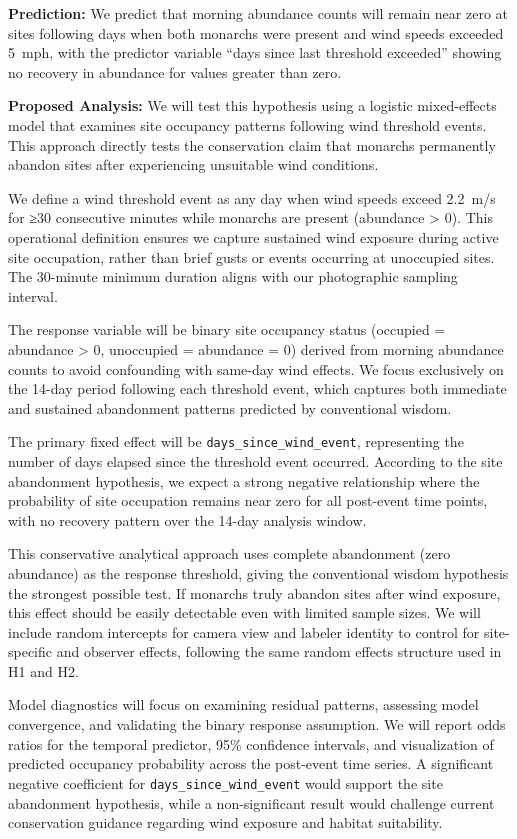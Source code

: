 \textbf{Prediction:} We predict that morning abundance counts will remain near zero at sites following days when both monarchs were present and wind speeds exceeded 5~mph, with the predictor variable ``days since last threshold exceeded'' showing no recovery in abundance for values greater than zero.

\textbf{Proposed Analysis:}
We will test this hypothesis using a logistic mixed-effects model that examines site occupancy patterns following wind threshold events. This approach directly tests the conservation claim that monarchs permanently abandon sites after experiencing unsuitable wind conditions.

We define a wind threshold event as any day when wind speeds exceed 2.2~m/s for ≥30 consecutive minutes while monarchs are present (abundance > 0). This operational definition ensures we capture sustained wind exposure during active site occupation, rather than brief gusts or events occurring at unoccupied sites. The 30-minute minimum duration aligns with our photographic sampling interval.

The response variable will be binary site occupancy status (occupied = abundance > 0, unoccupied = abundance = 0) derived from morning abundance counts to avoid confounding with same-day wind effects. We focus exclusively on the 14-day period following each threshold event, which captures both immediate and sustained abandonment patterns predicted by conventional wisdom.

The primary fixed effect will be \texttt{days\_since\_wind\_event}, representing the number of days elapsed since the threshold event occurred. According to the site abandonment hypothesis, we expect a strong negative relationship where the probability of site occupation remains near zero for all post-event time points, with no recovery pattern over the 14-day analysis window.

This conservative analytical approach uses complete abandonment (zero abundance) as the response threshold, giving the conventional wisdom hypothesis the strongest possible test. If monarchs truly abandon sites after wind exposure, this effect should be easily detectable even with limited sample sizes. We will include random intercepts for camera view and labeler identity to control for site-specific and observer effects, following the same random effects structure used in H1 and H2.

Model diagnostics will focus on examining residual patterns, assessing model convergence, and validating the binary response assumption. We will report odds ratios for the temporal predictor, 95\% confidence intervals, and visualization of predicted occupancy probability across the post-event time series. A significant negative coefficient for \texttt{days\_since\_wind\_event} would support the site abandonment hypothesis, while a non-significant result would challenge current conservation guidance regarding wind exposure and habitat suitability.

